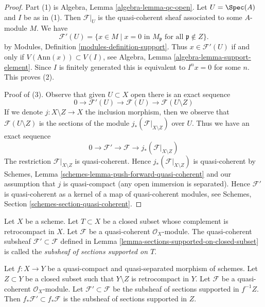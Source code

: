 \begin{proof}
Part (1) is Algebra, Lemma \ref{algebra-lemma-qc-open}.
Let $U = \Spec(A)$ and $I$ be as in (1).
Then $\mathcal{F}|_U$ is the quasi-coherent sheaf associated to
some $A$-module $M$. We have
$$
\mathcal{F}'(U) = \{x \in M \mid x = 0\text{ in }M_\mathfrak p
\text{ for all }\mathfrak p \not \in Z\}.
$$
by Modules, Definition \ref{modules-definition-support}. Thus
$x \in \mathcal{F}'(U)$ if and only if $V(\text{Ann}(x)) \subset V(I)$, see
Algebra, Lemma \ref{algebra-lemma-support-element}. Since $I$ is
finitely generated this is equivalent to $I^n x = 0$ for some $n$.
This proves (2).

\medskip\noindent
Proof of (3). Observe that given $U \subset X$ open there is an exact sequence
$$
0 \to \mathcal{F}'(U) \to \mathcal{F}(U) \to \mathcal{F}(U \setminus Z)
$$
If we denote $j : X \setminus Z \to X$ the inclusion morphism, then
we observe that $\mathcal{F}(U \setminus Z)$ is the sections of the
module $j_*(\mathcal{F}|_{X \setminus Z})$ over $U$. Thus we have
an exact sequence
$$
0 \to \mathcal{F}' \to \mathcal{F} \to j_*(\mathcal{F}|_{X \setminus Z})
$$
The restriction $\mathcal{F}|_{X \setminus Z}$ is quasi-coherent.
Hence $j_*(\mathcal{F}|_{X \setminus Z})$ is quasi-coherent
by Schemes, Lemma \ref{schemes-lemma-push-forward-quasi-coherent}
and our assumption that $j$ is quasi-compact (any open immersion
is separated). Hence $\mathcal{F}'$ is quasi-coherent
as a kernel of a map of quasi-coherent modules, see
Schemes, Section \ref{schemes-section-quasi-coherent}.
\end{proof}

\begin{definition}
\label{definition-subsheaf-sections-supported-on-closed}
Let $X$ be a scheme.
Let $T \subset X$ be a closed subset whose complement
is retrocompact in $X$.
Let $\mathcal{F}$ be a quasi-coherent $\mathcal{O}_X$-module.
The quasi-coherent subsheaf $\mathcal{F}' \subset \mathcal{F}$ defined in
Lemma \ref{lemma-sections-supported-on-closed-subset} is called
the {\it subsheaf of sections supported on $T$}.
\end{definition}

\begin{lemma}
\label{lemma-push-sections-supported-on-closed-subset}
Let $f : X \to Y$ be a quasi-compact and quasi-separated morphism
of schemes. Let $Z \subset Y$ be a closed subset such that
$Y \setminus Z$ is retrocompact in $Y$. Let $\mathcal{F}$ be a quasi-coherent
$\mathcal{O}_X$-module. Let $\mathcal{F}' \subset \mathcal{F}$
be the subsheaf of sections supported in $f^{-1}Z$.
Then $f_*\mathcal{F}' \subset f_*\mathcal{F}$ is the subsheaf
of sections supported in $Z$.
\end{lemma}

